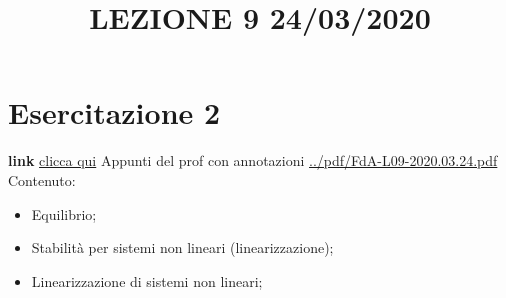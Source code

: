 \section{Esercitazione 2}
\title{LEZIONE 9 24/03/2020}\newline
\textbf{link} \href{https://web.microsoftstream.com/video/c0596b77-fd44-467c-8085-683611779644?list=user&userId=faa91214-a6f5-40d7-8875-253fd49b8ce1}{clicca qui}\newline
\newline
Appunti del prof con annotazioni \url{../pdf/FdA-L09-2020.03.24.pdf}\newline
Contenuto:
\begin{itemize}
    \item Equilibrio;
    \item Stabilità per sistemi non lineari (linearizzazione);
    \item Linearizzazione di sistemi non lineari;
\end{itemize}
